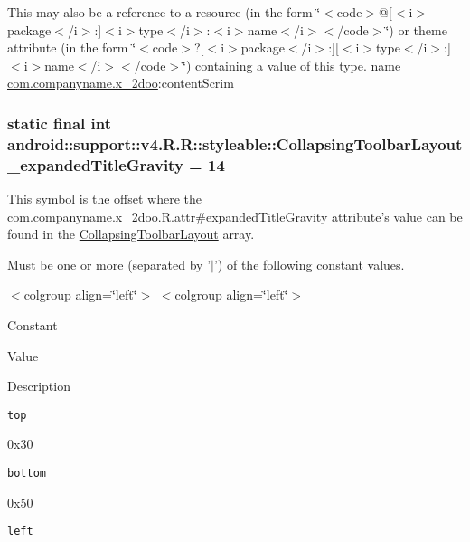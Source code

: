 This may also be a reference to a resource (in the form \char`\"{}$<$code$>$@\mbox{[}$<$i$>$package$<$/i$>$:\mbox{]}$<$i$>$type$<$/i$>$:$<$i$>$name$<$/i$>$$<$/code$>$\char`\"{}) or theme attribute (in the form \char`\"{}$<$code$>$?\mbox{[}$<$i$>$package$<$/i$>$:\mbox{]}\mbox{[}$<$i$>$type$<$/i$>$:\mbox{]}$<$i$>$name$<$/i$>$$<$/code$>$\char`\"{}) containing a value of this type.  name \hyperlink{namespacecom_1_1companyname_1_1x__2doo}{com.companyname.x\_\-2doo}:contentScrim \hypertarget{classandroid_1_1support_1_1v4_1_1_r_1_1styleable_93665cc12bb385c8014cbdcaa5d898a6}{
\subsubsection[{CollapsingToolbarLayout\_\-expandedTitleGravity}]{\setlength{\rightskip}{0pt plus 5cm}static final int android::support::v4.R.R::styleable::CollapsingToolbarLayout\_\-expandedTitleGravity = 14}}
\label{classandroid_1_1support_1_1v4_1_1_r_1_1styleable_93665cc12bb385c8014cbdcaa5d898a6}


This symbol is the offset where the \hyperlink{classcom_1_1companyname_1_1x__2doo_1_1_r_1_1attr_8a7bc05444491dc5cf47280086e1c076}{com.companyname.x\_\-2doo.R.attr\#expandedTitleGravity} attribute's value can be found in the \hyperlink{classandroid_1_1support_1_1v4_1_1_r_1_1styleable_aa101903fcf4b45a3b7fee0a0abc5ea8}{CollapsingToolbarLayout} array.

Must be one or more (separated by '$|$') of the following constant values. \begin{TabularC}{0}
\hline
\end{TabularC}
$<$colgroup align=\char`\"{}left\char`\"{}$>$ $<$colgroup align=\char`\"{}left\char`\"{}$>$ 

Constant

Value

Description 

{\tt top}

0x30

{\tt bottom}

0x50

{\tt left}

